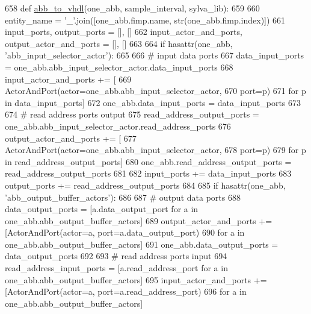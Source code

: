 \begin{DoxyCode}
658 \textcolor{keyword}{def }\hyperlink{namespacesylva_1_1code__generation_1_1air_a353257c84de380833218457a45c3f2a3}{abb\_to\_vhdl}(one\_abb, sample\_interval, sylva\_lib):
659 
660     entity\_name = \textcolor{stringliteral}{'\_'}.join([one\_abb.fimp.name, str(one\_abb.fimp.index)])
661     input\_ports, output\_ports = [], []
662     input\_actor\_and\_ports, output\_actor\_and\_ports = [], []
663 
664     \textcolor{keywordflow}{if} hasattr(one\_abb, \textcolor{stringliteral}{'abb\_input\_selector\_actor'}):
665 
666         \textcolor{comment}{# input data ports}
667         data\_input\_ports = one\_abb.abb\_input\_selector\_actor.data\_input\_ports
668         input\_actor\_and\_ports += [
669             ActorAndPort(actor=one\_abb.abb\_input\_selector\_actor,
670                          port=p)
671             \textcolor{keywordflow}{for} p \textcolor{keywordflow}{in} data\_input\_ports]
672         one\_abb.data\_input\_ports = data\_input\_ports
673 
674         \textcolor{comment}{# read address ports output}
675         read\_address\_output\_ports = one\_abb.abb\_input\_selector\_actor.read\_address\_ports
676         output\_actor\_and\_ports += [
677             ActorAndPort(actor=one\_abb.abb\_input\_selector\_actor,
678                          port=p)
679             \textcolor{keywordflow}{for} p \textcolor{keywordflow}{in} read\_address\_output\_ports]
680         one\_abb.read\_address\_output\_ports = read\_address\_output\_ports
681 
682         input\_ports += data\_input\_ports
683         output\_ports += read\_address\_output\_ports
684 
685     \textcolor{keywordflow}{if} hasattr(one\_abb, \textcolor{stringliteral}{'abb\_output\_buffer\_actors'}):
686 
687         \textcolor{comment}{# output data ports}
688         data\_output\_ports = [a.data\_output\_port \textcolor{keywordflow}{for} a \textcolor{keywordflow}{in} one\_abb.abb\_output\_buffer\_actors]
689         output\_actor\_and\_ports += [ActorAndPort(actor=a, port=a.data\_output\_port)
690                                    \textcolor{keywordflow}{for} a \textcolor{keywordflow}{in} one\_abb.abb\_output\_buffer\_actors]
691         one\_abb.data\_output\_ports = data\_output\_ports
692 
693         \textcolor{comment}{# read address ports input}
694         read\_address\_input\_ports = [a.read\_address\_port \textcolor{keywordflow}{for} a \textcolor{keywordflow}{in} one\_abb.abb\_output\_buffer\_actors]
695         input\_actor\_and\_ports += [ActorAndPort(actor=a, port=a.read\_address\_port)
696                                   \textcolor{keywordflow}{for} a \textcolor{keywordflow}{in} one\_abb.abb\_output\_buffer\_actors]

\end{DoxyCode}
